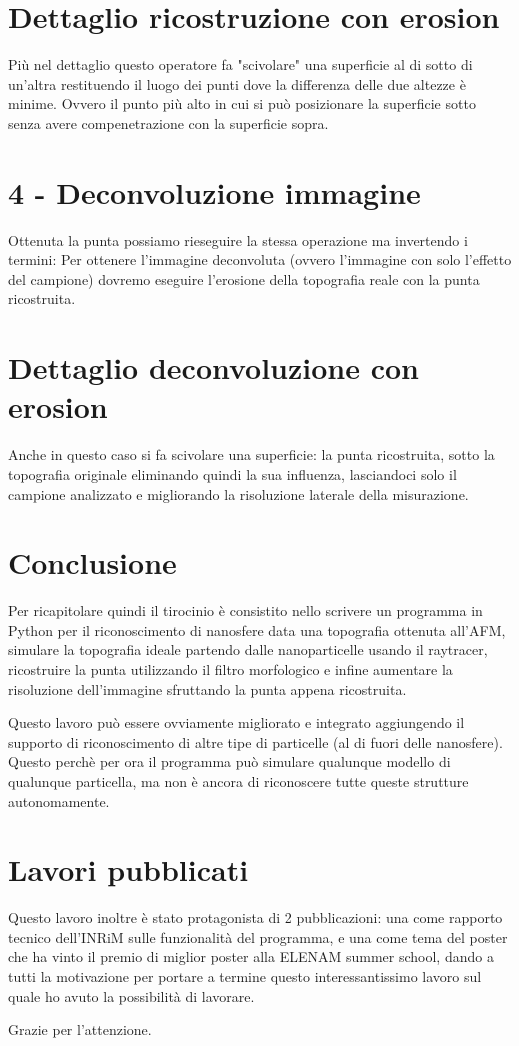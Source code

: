 \documentclass[12pt]{report}
\begin{document}
\section{Dettaglio ricostruzione con erosion}

Più nel dettaglio questo operatore fa "scivolare" una superficie al di sotto di un'altra restituendo il luogo dei punti dove la differenza delle due altezze è minime. Ovvero il punto più alto in cui si può posizionare la superficie sotto senza avere compenetrazione con la superficie sopra.

\section{4 - Deconvoluzione immagine}

Ottenuta la punta possiamo rieseguire la stessa operazione ma invertendo i termini: Per ottenere l'immagine deconvoluta (ovvero l'immagine con solo l'effetto del campione) dovremo eseguire l'erosione della topografia reale con la punta ricostruita. 

\section{Dettaglio deconvoluzione con erosion}

Anche in questo caso si fa scivolare una superficie: la punta ricostruita, sotto la topografia originale eliminando quindi la sua influenza, lasciandoci solo il campione analizzato e migliorando la risoluzione laterale della misurazione.

\section{Conclusione}

Per ricapitolare quindi il tirocinio è consistito nello scrivere un programma in Python per il riconoscimento di nanosfere data una topografia ottenuta all'AFM, simulare la topografia ideale partendo dalle nanoparticelle usando il raytracer, ricostruire la punta utilizzando il filtro morfologico e infine aumentare la risoluzione dell'immagine sfruttando la punta appena ricostruita. 

Questo lavoro può essere ovviamente migliorato e integrato aggiungendo il supporto di riconoscimento di altre tipe di particelle (al di fuori delle nanosfere). Questo perchè per ora il programma può simulare qualunque modello di qualunque particella, ma non è ancora di riconoscere tutte queste strutture autonomamente.

\section{Lavori pubblicati}

Questo lavoro inoltre è stato protagonista di 2 pubblicazioni: una come rapporto tecnico dell'INRiM sulle funzionalità del programma, e una come tema del poster che ha vinto il premio di miglior poster alla ELENAM summer school, dando a tutti la motivazione per portare a termine questo interessantissimo lavoro sul quale ho avuto la possibilità di lavorare.

Grazie per l'attenzione.
\end{document}

